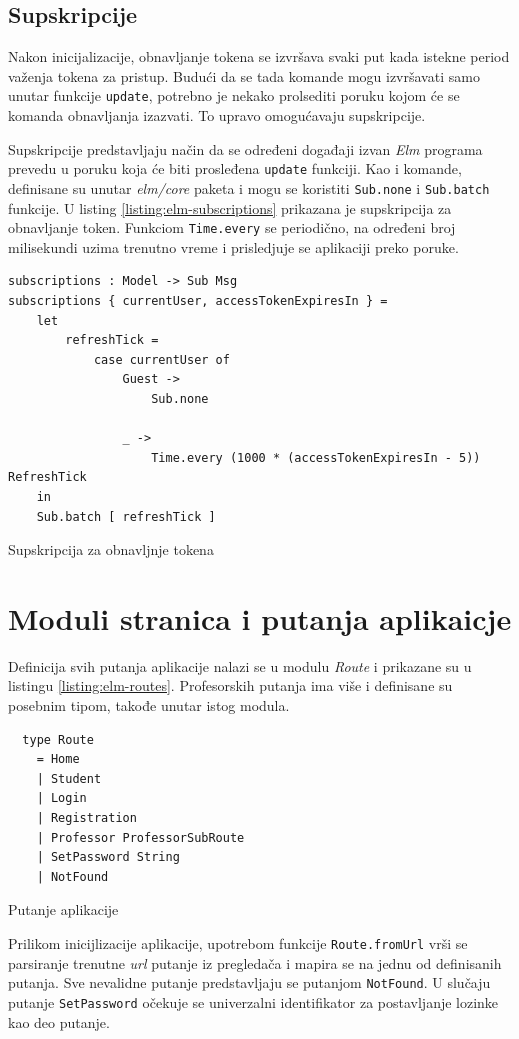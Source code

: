 \documentclass[12pt,oneside]{memoir}
\begin{document}
\subsection{Supskripcije}
Nakon inicijalizacije, obnavljanje tokena se izvršava svaki put kada istekne period važenja tokena za pristup.
Budući da se tada komande mogu izvršavati samo unutar funkcije \texttt{update}, potrebno je nekako prolsediti poruku
kojom će se komanda obnavljanja izazvati. To upravo omogućavaju supskripcije.

Supskripcije predstavljaju način da se određeni događaji izvan \emph{Elm} programa prevedu u
poruku koja će biti prosleđena \texttt{update} funkciji. Kao i komande, definisane su unutar \emph{elm/core}
paketa i mogu se koristiti \texttt{Sub.none} i \texttt{Sub.batch} funkcije.
U listing \ref{listing:elm-subscriptions} prikazana je supskripcija za obnavljanje
token. Funkciom \texttt{Time.every} se periodično, na određeni broj milisekundi uzima trenutno vreme i prisledjuje se
aplikaciji preko poruke. 
\begin{listing}[h]
\begin{verbatim}
subscriptions : Model -> Sub Msg
subscriptions { currentUser, accessTokenExpiresIn } =
    let
        refreshTick =
            case currentUser of
                Guest ->
                    Sub.none

                _ ->
                    Time.every (1000 * (accessTokenExpiresIn - 5)) RefreshTick
    in
    Sub.batch [ refreshTick ]
\end{verbatim}
\caption{Supskripcija za obnavljnje tokena}
\label{listing:elm-subscriptions}
\end{listing}

\section{Moduli stranica i putanja aplikaicje}
Definicija svih putanja aplikacije nalazi se u modulu \emph{Route} i prikazane su u listingu \ref{listing:elm-routes}.
Profesorskih putanja ima više i definisane su posebnim tipom, takođe unutar istog modula.
\begin{listing}[h]
\begin{verbatim}
  type Route
    = Home
    | Student
    | Login
    | Registration
    | Professor ProfessorSubRoute
    | SetPassword String
    | NotFound
\end{verbatim}
\caption{Putanje aplikacije}
\label{listing:elm-routes}
\end{listing}
Prilikom inicijlizacije aplikacije, upotrebom funkcije \texttt{Route.fromUrl} vrši se parsiranje trenutne
\emph{url} putanje iz pregledača i mapira se na jednu od definisanih putanja. Sve nevalidne putanje 
predstavljaju se putanjom \texttt{NotFound}. U slučaju putanje \texttt{SetPassword} očekuje se univerzalni
identifikator za postavljanje lozinke kao deo putanje.
\end{document}
